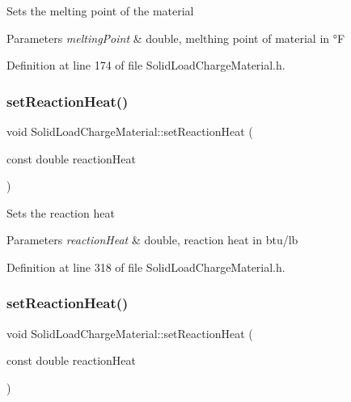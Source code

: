 Sets the melting point of the material 
\begin{DoxyParams}{Parameters}
{\em melting\+Point} & double, melthing point of material in °F \\
\hline
\end{DoxyParams}


Definition at line 174 of file Solid\+Load\+Charge\+Material.\+h.

\mbox{\label{class_solid_load_charge_material_a9c3cd28b2b31fb66eea984d9030cd247}} 
\subsubsection{\texorpdfstring{set\+Reaction\+Heat()}{setReactionHeat()}\hspace{0.1cm}{\footnotesize\ttfamily [1/3]}}
{\footnotesize\ttfamily void Solid\+Load\+Charge\+Material\+::set\+Reaction\+Heat (\begin{DoxyParamCaption}\item[{const double}]{reaction\+Heat }\end{DoxyParamCaption})\hspace{0.3cm}{\ttfamily [inline]}}

Sets the reaction heat 
\begin{DoxyParams}{Parameters}
{\em reaction\+Heat} & double, reaction heat in btu/lb \\
\hline
\end{DoxyParams}


Definition at line 318 of file Solid\+Load\+Charge\+Material.\+h.

\mbox{\label{class_solid_load_charge_material_a9c3cd28b2b31fb66eea984d9030cd247}} 
\subsubsection{\texorpdfstring{set\+Reaction\+Heat()}{setReactionHeat()}\hspace{0.1cm}{\footnotesize\ttfamily [2/3]}}
{\footnotesize\ttfamily void Solid\+Load\+Charge\+Material\+::set\+Reaction\+Heat (\begin{DoxyParamCaption}\item[{const double}]{reaction\+Heat }\end{DoxyParamCaption})\hspace{0.3cm}{\ttfamily [inline]}}

